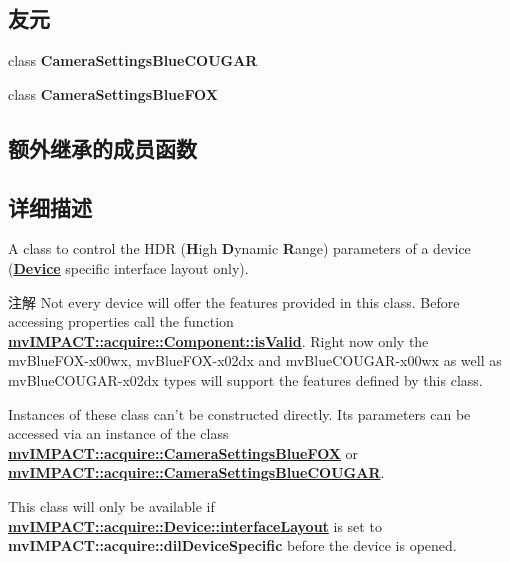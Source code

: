 \subsection*{友元}
\begin{DoxyCompactItemize}
\item 
\hypertarget{classmv_i_m_p_a_c_t_1_1acquire_1_1_h_d_r_control_abb8b34d4826a4241462f6682dead7323}{class {\bfseries Camera\+Settings\+Blue\+C\+O\+U\+G\+A\+R}}\label{classmv_i_m_p_a_c_t_1_1acquire_1_1_h_d_r_control_abb8b34d4826a4241462f6682dead7323}

\item 
\hypertarget{classmv_i_m_p_a_c_t_1_1acquire_1_1_h_d_r_control_a53bd4e941b7aa3f1b238d16446d838e7}{class {\bfseries Camera\+Settings\+Blue\+F\+O\+X}}\label{classmv_i_m_p_a_c_t_1_1acquire_1_1_h_d_r_control_a53bd4e941b7aa3f1b238d16446d838e7}

\end{DoxyCompactItemize}
\subsection*{额外继承的成员函数}


\subsection{详细描述}
A class to control the H\+D\+R ({\bfseries H}igh {\bfseries D}ynamic {\bfseries R}ange) parameters of a device ({\bfseries \hyperlink{classmv_i_m_p_a_c_t_1_1acquire_1_1_device}{Device}} specific interface layout only). 

\begin{DoxyNote}{注解}
Not every device will offer the features provided in this class. Before accessing properties call the function {\bfseries \hyperlink{classmv_i_m_p_a_c_t_1_1acquire_1_1_component_ac51e55e7e046101f3c6119d84123abd5}{mv\+I\+M\+P\+A\+C\+T\+::acquire\+::\+Component\+::is\+Valid}}. Right now only the mv\+Blue\+F\+O\+X-\/x00wx, mv\+Blue\+F\+O\+X-\/x02dx and mv\+Blue\+C\+O\+U\+G\+A\+R-\/x00wx as well as mv\+Blue\+C\+O\+U\+G\+A\+R-\/x02dx types will support the features defined by this class.

Instances of these class can't be constructed directly. Its parameters can be accessed via an instance of the class {\bfseries \hyperlink{classmv_i_m_p_a_c_t_1_1acquire_1_1_camera_settings_blue_f_o_x}{mv\+I\+M\+P\+A\+C\+T\+::acquire\+::\+Camera\+Settings\+Blue\+F\+O\+X}} or {\bfseries \hyperlink{classmv_i_m_p_a_c_t_1_1acquire_1_1_camera_settings_blue_c_o_u_g_a_r}{mv\+I\+M\+P\+A\+C\+T\+::acquire\+::\+Camera\+Settings\+Blue\+C\+O\+U\+G\+A\+R}}.

This class will only be available if {\bfseries \hyperlink{classmv_i_m_p_a_c_t_1_1acquire_1_1_device_ab4dd0ecc9d456bb5ddc01d844c9d6f2d}{mv\+I\+M\+P\+A\+C\+T\+::acquire\+::\+Device\+::interface\+Layout}} is set to {\bfseries mv\+I\+M\+P\+A\+C\+T\+::acquire\+::dil\+Device\+Specific} before the device is opened. 
\end{DoxyNote}


